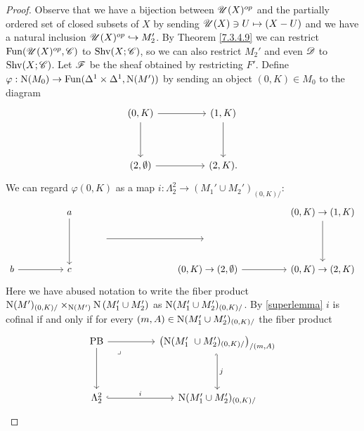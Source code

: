 \documentclass[../../thesis.tex]{subfiles}
\begin{document}
\begin{proof}
    Observe that we have a bijection between $\mathscr{U}(X)^{op}$ and the partially ordered set of closed subsets of $X$ by sending $\mathscr{U}(X) \ni U \mapsto (X - U)$ and we have a natural inclusion $\mathscr{U}(X)^{op} \hookrightarrow M_2'$.
    By Theorem \ref{7.3.4.9} we can restrict $\mathrm{Fun}(\mathscr{U}(X)^{op}, \mathscr{C})$ to $\mathrm{Shv}(X;\mathscr{C})$, so we can also restrict $M_2'$ and even $\mathscr{D}$ to $\mathrm{Shv}(X;\mathscr{C})$.
    Let $\mathscr{F}$ be the sheaf obtained by restricting $F'$.
    Define $\varphi:\mathrm{N}(M_0) \to \mathrm{Fun}(\Delta^1\times \Delta^1, \mathrm{N}(M'))$ by sending an object $(0,K) \in M_0$ to the diagram
    \[\begin{tikzcd}
            {(0,K)} && {(1,K)} \\
            \\
            {(2,\emptyset)} && {(2,K)}
            \arrow[from=1-1, to=1-3]
            \arrow[from=1-3, to=3-3]
            \arrow[from=3-1, to=3-3]
            \arrow[from=1-1, to=3-1].
        \end{tikzcd}\]
    We can regard $\varphi(0,K)$ as a map $i: \Lambda_2^2 \to (M_1'\cup M_2')_{(0,K)/}$:
    \[\begin{tikzcd}
            && a &&&&&& {(0,K)\to(1,K)} \\
            &&& {} &&& {} \\
            b && c &&&& {(0,K)\to(2,\emptyset)} && {(0,K)\to(2,K)}
            \arrow[from=1-9, to=3-9]
            \arrow[from=3-7, to=3-9]
            \arrow[from=3-1, to=3-3]
            \arrow[from=1-3, to=3-3]
            \arrow[from=2-4, to=2-7]
        \end{tikzcd}\]
    Here we have abused notation to write the fiber product $\mathrm{N}(M')_{(0, K) /} \times_{\mathrm{N}(M')}\mathrm{N}\left(M_1^{\prime} \cup M_2^{\prime}\right)$ as $ \mathrm{N}(M_1'\cup M_2')_{(0,K)/}$. By \ref{superlemma} $i$ is cofinal if and only if for every $(m,A) \in \mathrm{N}(M_1'\cup M_2')_{(0,K)/}$ the fiber product
    \[\begin{tikzcd}
            {\mathrm{PB}} && {\left(\Nerve(M_1' \cup M_2')_{(0,K)/}\right)_{/(m,A)}} \\
            \\
            {\Lambda_2^2} && {\Nerve(M_1'\cup M_2')_{(0,K)/}}
            \arrow[from=1-1, to=1-3]
            \arrow["j", hook',from=1-3, to=3-3]
            \arrow["i", hook,from=3-1, to=3-3]
            \arrow[from=1-1, to=3-1]
            \arrow["\lrcorner"{anchor=center, pos=0.125}, draw=none, from=1-1, to=3-3]
        \end{tikzcd}\]

\end{proof}
\end{document}
